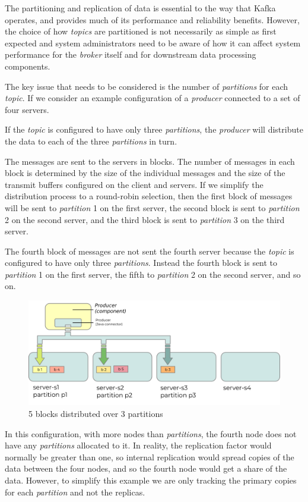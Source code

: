\documentclass{article}
\newcommand{\kftopic} {\textit{topic}\xspace}
\newcommand{\kftopics} {\textit{topics}\xspace}
\newcommand{\kfbroker} {\textit{broker}\xspace}
\newcommand{\kfproducer} {\textit{producer}\xspace}
\newcommand{\kfpartition} {\textit{partition}\xspace}
\newcommand{\kfpartitions} {\textit{partitions}\xspace}
\begin{document}
The partitioning and replication of data is essential to the way that Kafka operates, and provides much of its performance and reliability benefits.
However, the choice of how \kftopics are partitioned is not necessarily as simple as first expected and system administrators need to be aware of how it can affect system performance for the \kfbroker itself and for downstream data processing components.

The key issue that needs to be considered is the number of \kfpartitions for each \kftopic. If we consider an example configuration of a \kfproducer connected to a set of four servers.

If the \kftopic is configured to have only three \kfpartitions, the \kfproducer will distribute the data to each of the three \kfpartitions in turn.

The messages are sent to the servers in blocks. The number of messages in each block is determined by the size of the individual messages and the size of the transmit buffers configured on the client and servers.
If we simplify the distribution process to a round-robin selection, then the first block of messages will be sent to \kfpartition 1 on the first server, the second block is sent to \kfpartition 2 on the second server, and the third block is sent to \kfpartition 3 on the third server.

The fourth block of messages are not sent the fourth server because the \kftopic is configured to have only three \kfpartitions.
Instead the fourth block is sent to \kfpartition 1 on the first server, the fifth to \kfpartition 2 on the second server, and so on.

\begin{figure}[H]
\centering
\includegraphics{images/kafka-partitions-05.png}
%
\caption{5 blocks distributed over 3 partitions}
\label{fig:kafka-partitions-05}
\end{figure}

In this configuration, with more nodes than \kfpartitions, the fourth node does not have any \kfpartitions allocated to it.
In reality, the replication factor would normally be greater than one, so internal replication would spread copies of the data between the four nodes, and so the fourth node would get a share of the data.
However, to simplify this example we are only tracking the primary copies for each \kfpartition and not the replicas.
\end{document}
